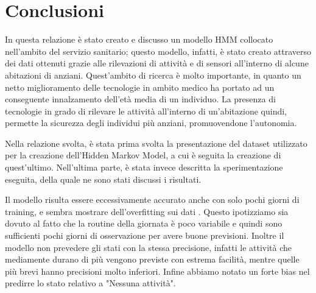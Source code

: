 \documentclass[10pt,a4paper]{article}
\begin{document}
	\clearpage
	\section{Conclusioni}

	In questa relazione è stato creato e discusso un modello HMM collocato nell'ambito del servizio sanitario; questo modello, infatti, è stato creato attraverso dei dati ottenuti grazie alle rilevazioni di attività e di sensori all'interno di alcune abitazioni di anziani. Quest'ambito di ricerca è molto importante, in quanto un netto miglioramento delle tecnologie in ambito medico ha portato ad un conseguente innalzamento dell'età media di un individuo. La presenza di tecnologie in grado di rilevare le attività all'interno di un'abitazione quindi, permette la sicurezza degli individui più anziani, promuovendone l'autonomia.

	Nella relazione svolta, è stata prima svolta la presentazione del dataset utilizzato per la creazione dell'Hidden Markov Model, a cui è seguita la creazione di quest'ultimo.
	Nell'ultima parte, è stata invece descritta la sperimentazione eseguita, della quale ne sono stati discussi i risultati.

	Il modello risulta essere eccessivamente accurato anche con solo pochi giorni di training, e sembra mostrare dell'overfitting sui dati . Questo ipotizziamo sia dovuto al fatto che la routine della giornata è poco variabile e quindi sono sufficienti pochi giorni di osservazione per avere buone previsioni. Inoltre il modello non prevedere gli stati con la stessa precisione, infatti le attività che mediamente durano di più vengono previste con estrema facilità, mentre quelle più brevi hanno precisioni molto inferiori. Infine abbiamo notato un forte bias nel predirre lo stato relativo a "Nessuna attività".
\end{document}
